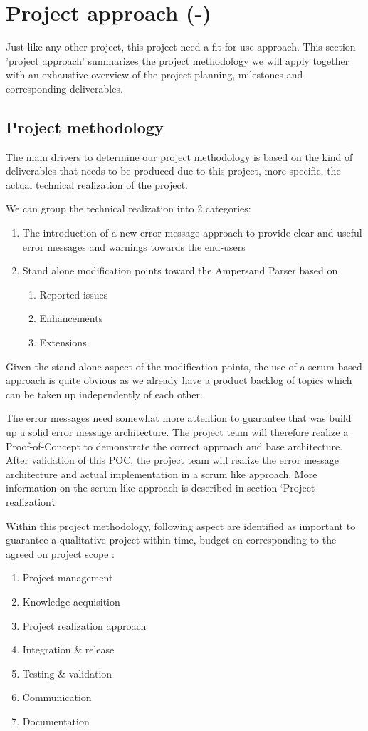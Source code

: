 \section{Project approach (-)}
\label{sec:project-approach}
Just like any other project, this project need a fit-for-use approach. 
This section 'project approach' summarizes the project methodology we will apply together with an exhaustive overview of the project planning, milestones and corresponding deliverables.
\subsection{Project methodology}
The main drivers to determine our project methodology is based on the kind of deliverables that needs to be produced due to this project, more specific, the actual technical realization of the project.

We can group the technical realization into 2 categories:
\begin{enumerate}
	\item The introduction of a new error message approach to provide clear and useful error messages and warnings towards the end-users
	\item Stand alone modification points toward the Ampersand Parser based on
	\begin{enumerate}
		\item Reported issues
		\item Enhancements
		\item Extensions
	\end {enumerate}
\end {enumerate}

Given the stand alone aspect of the modification points, the use of a scrum based approach is quite obvious as we already have a product backlog of topics which can be taken up independently of each other. 

The error messages need somewhat more attention to guarantee that was build up a solid error message architecture. The project team will therefore realize a Proof-of-Concept to demonstrate the correct approach and base architecture. After validation of this POC, the project team will realize the error message architecture and actual implementation in a scrum like approach.
More information on the scrum like approach is described in section ‘Project realization’.


Within this project methodology, following aspect are identified as important to guarantee a qualitative project within time, budget en corresponding to the agreed on project scope : 
\begin{enumerate}
	\item Project management
	\item Knowledge acquisition 
	\item Project realization approach
	\item Integration \& release
	\item Testing & validation
	\item Communication
	\item Documentation
\end {enumerate}

